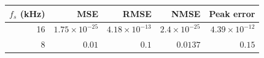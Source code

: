 \begin{tabular}{rrrrr}
\toprule
$f_s$ (kHz) & MSE & RMSE & NMSE & Peak error \\
\midrule
16 & $1.75\times10^{-25}$ & $4.18\times10^{-13}$ & $2.4\times10^{-25}$ & $4.39\times10^{-12}$ \\
8 & $0.01$ & $0.1$ & $0.0137$ & $0.15$ \\
\bottomrule
\end{tabular}
